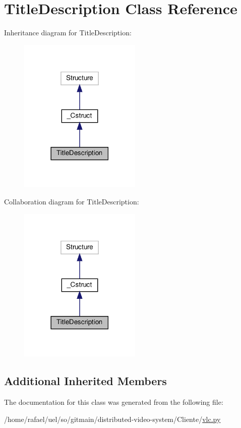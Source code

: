 \hypertarget{classvlc_1_1_title_description}{}\section{Title\+Description Class Reference}
\label{classvlc_1_1_title_description}


Inheritance diagram for Title\+Description\+:
\nopagebreak
\begin{figure}[H]
\begin{center}
\leavevmode
\includegraphics[width=165pt]{classvlc_1_1_title_description__inherit__graph}
\end{center}
\end{figure}


Collaboration diagram for Title\+Description\+:
\nopagebreak
\begin{figure}[H]
\begin{center}
\leavevmode
\includegraphics[width=165pt]{classvlc_1_1_title_description__coll__graph}
\end{center}
\end{figure}
\subsection*{Additional Inherited Members}


The documentation for this class was generated from the following file\+:\begin{DoxyCompactItemize}
\item 
/home/rafael/uel/so/gitmain/distributed-\/video-\/system/\+Cliente/\hyperlink{vlc_8py}{vlc.\+py}\end{DoxyCompactItemize}
